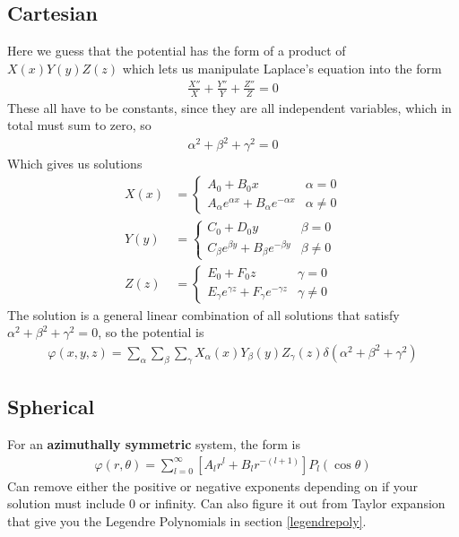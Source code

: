 \subsection{Cartesian}
Here we guess that the potential has the form of a product of $X(x)Y(y)Z(z)$ which lets us manipulate Laplace's equation into the form
\begin{align}
\frac{X''}{X} + \frac{Y''}{Y} + \frac{Z''}{Z} = 0
\end{align}
These all have to be constants, since they are all independent variables, which in total must sum to zero, so 
\begin{align}
\alpha^2 + \beta^2 + \gamma^2 = 0
\end{align}
Which gives us solutions
\begin{align}
X(x) &= \begin{cases}
A_0 +B_0x &\alpha = 0\\
A_\alpha e^{\alpha x} + B_\alpha e^{-\alpha x} &\alpha \neq 0
\end{cases}\\
Y(y) &= \begin{cases}
C_0 +D_0y &\beta = 0\\
C_\beta e^{\beta y} + B_\beta e^{-\beta y} &\beta \neq 0
\end{cases}\\
Z(z) &= \begin{cases}
E_0 +F_0z &\gamma = 0\\
E_\gamma e^{\gamma z} + F_\gamma e^{-\gamma z} &\gamma \neq 0
\end{cases}
\end{align}
The solution is a general linear combination of all solutions that satisfy $\alpha^2+\beta^2+\gamma^2=0$, so the potential is
\begin{align}
\varphi(x,y,z) = \sum_\alpha \sum_\beta \sum_\gamma X_\alpha(x)Y_\beta(y)Z_\gamma(z) \delta(\alpha^2+\beta^2+\gamma^2)
\end{align}

\subsection{Spherical}
For an \textbf{azimuthally symmetric} system, the form is
\begin{align}\label{laplace}
\varphi(r,\theta)=\sum_{l=0}^\infty [A_l r^l+B_lr^{-(l+1)}]P_l(\cos\theta)
\end{align}
Can remove either the positive or negative exponents depending on if your solution must include 0 or infinity. Can also figure it out from Taylor expansion that give you the Legendre Polynomials in section \ref{legendrepoly}. 

